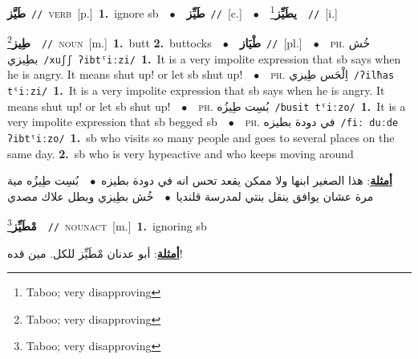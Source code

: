 \documentclass[10pt,a4paper,twoside]{article} %
\begin{document}
\begin{multicols}{2}
{\setlength\topsep{0pt}\textbf{\foreignlanguage{arabic}{طَيَّز}}\ {\color{gray}\texttt{//}\color{black}}\ \textsc{verb}\ [p.]\ \textbf{1.}~ignore sb\ \ $\bullet$\ \ \setlength\topsep{0pt}\textbf{\foreignlanguage{arabic}{طَيِّز}}\ {\color{gray}\texttt{//}\color{black}}\ [c.]\ \ $\bullet$\ \ \setlength\topsep{0pt}\textbf{\foreignlanguage{arabic}{يطَيِّز}}\footnote{Taboo; very disapproving}\ \ {\color{gray}\texttt{//}\color{black}}\ [i.]\ } \vspace{2mm}

{\setlength\topsep{0pt}\textbf{\foreignlanguage{arabic}{طِيز}}\footnote{Taboo; very disapproving}\ \ {\color{gray}\texttt{//}\color{black}}\ \textsc{noun}\ [m.]\ \textbf{1.}~butt  \textbf{2.}~buttocks\ \ $\bullet$\ \ \setlength\topsep{0pt}\textbf{\foreignlanguage{arabic}{طْيَاز}}\ {\color{gray}\texttt{//}\color{black}}\ [pl.]\ \ $\bullet$\ \ \textsc{ph.} \color{gray} \foreignlanguage{arabic}{خُش بطِيزي}\color{black}\ {\color{gray}\texttt{/{\sffamily xuʃʃ ʔibtˤiːzi}/}\color{black}}\ \textbf{1.}~It is a very impolite expression that sb says when he is angry. It means shut up! or let sb shut up!\ \ $\bullet$\ \ \textsc{ph.} \color{gray} \foreignlanguage{arabic}{اِلْحَس طِيزي}\color{black}\ {\color{gray}\texttt{/{\sffamily ʔilħas tˤiːzi}/}\color{black}}\ \textbf{1.}~It is a very impolite expression that sb says when he is angry. It means shut up! or let sb shut up!\ \ $\bullet$\ \ \textsc{ph.} \color{gray} \foreignlanguage{arabic}{بُسِت طِيزُه}\color{black}\ {\color{gray}\texttt{/{\sffamily busit tˤiːzo}/}\color{black}}\ \textbf{1.}~It is a very impolite expression that sb begged sb\ \ $\bullet$\ \ \textsc{ph.} \color{gray} \foreignlanguage{arabic}{في دودة بطيزه}\color{black}\ {\color{gray}\texttt{/{\sffamily fiː duːde ʔibtˤiːzo}/}\color{black}}\ \textbf{1.}~sb who visits so many people and goes to several places on the same day.  \textbf{2.}~sb who is very hypeactive and who keeps moving around\  \begin{flushright}\color{gray}\foreignlanguage{arabic}{\textbf{\underline{\foreignlanguage{arabic}{أمثلة}}}: هذا الصغير ابنها ولا ممكن يقعد تحس انه في دودة بطيزه\ $\bullet$\ \  بُسِت طِيزُه مية مرة عشان يوافق ينقل بنتي لمدرسة قلنديا\ $\bullet$\ \  خُش بطِيزي وبطل علاك مصدي}\end{flushright}\color{black}} \vspace{2mm}

{\setlength\topsep{0pt}\textbf{\foreignlanguage{arabic}{مْطَيِّز}}\footnote{Taboo; very disapproving}\ \ {\color{gray}\texttt{//}\color{black}}\ \textsc{noun\textunderscore act}\ [m.]\ \textbf{1.}~ignoring sb\  \begin{flushright}\color{gray}\foreignlanguage{arabic}{\textbf{\underline{\foreignlanguage{arabic}{أمثلة}}}: أبو عدنان مْطَيِّز للكل. مين قده!}\end{flushright}\color{black}} \vspace{2mm}


\end{multicols}
\end{document}
